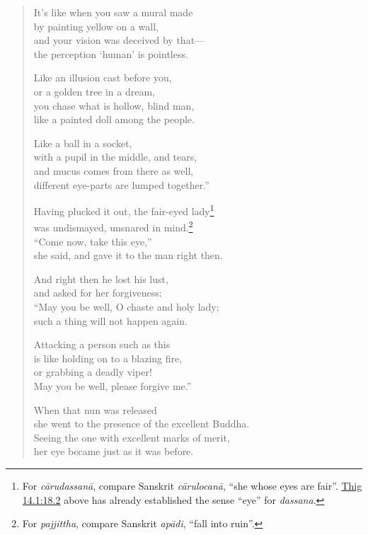 \documentclass[12pt,openany]{book}%
\begin{document}
\begin{verse}
It’s like when you saw a mural made \\
by painting yellow on a wall, \\
and your vision was deceived by that—\\
the perception ‘human’ is pointless. 

Like an illusion cast before you, \\
or a golden tree in a dream, \\
you chase what is hollow, blind man, \\
like a painted doll among the people. 

Like a ball in a socket, \\
with a pupil in the middle, and tears, \\
and mucus comes from there as well, \\
different eye-parts are lumped together.” 

Having plucked it out, the fair-eyed lady\footnote{For \textit{\textsanskrit{cārudassanā}}, compare Sanskrit \textit{\textsanskrit{cārulocanā}}, “she whose eyes are fair”. \href{https://suttacentral.net/thig14.1/en/sujato\#18.2}{Thig 14.1:18.2} above has already established the sense “eye” for \textit{dassana}. } \\
was undismayed, unsnared in mind.\footnote{For \textit{pajjittha}, compare Sanskrit \textit{\textsanskrit{apādi}}, “fall into ruin”. } \\
“Come now, take this eye,” \\
she said, and gave it to the man right then. 

And right then he lost his lust, \\
and asked for her forgiveness: \\
“May you be well, O chaste and holy lady; \\
such a thing will not happen again. 

Attacking a person such as this \\
is like holding on to a blazing fire, \\
or grabbing a deadly viper! \\
May you be well, please forgive me.” 

When that nun was released \\
she went to the presence of the excellent Buddha. \\
Seeing the one with excellent marks of merit, \\
her eye became just as it was before. 

%
\end{verse}
\end{document}
